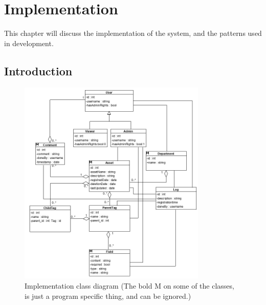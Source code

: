 \chapter{Implementation}
This chapter will discuss the implementation of the system, and the patterns used in development.
\par


\section{Introduction}

\begin{figure}[H]
    \centering
    \includegraphics[width=0.8\textwidth]{figures/ClassDiagramV6.PNG}
    \caption{Implementation class diagram (The bold M on some of the classes, is just a program specific thing, and can be ignored.)}
    \label{fig:CompleteClassDiagram}
\end{figure}